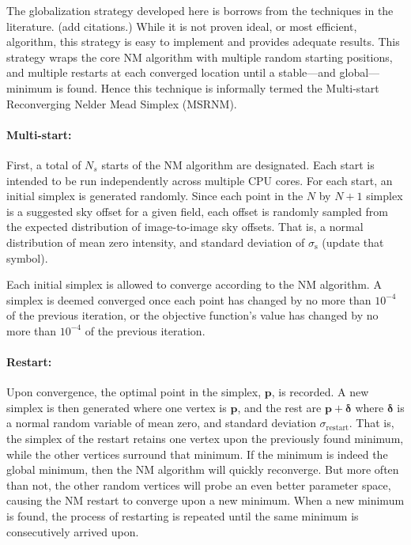 \documentclass[iop]{emulateapj}
\newcommand{\vect}[1]{\boldsymbol{#1}} %
\newcommand{\todo}[1]{\textcolor{RedOrange}{#1}} %
\begin{document}
The globalization strategy developed here is borrows from the techniques in the literature.
\todo{(add citations.)}
While it is not proven ideal, or most efficient, algorithm, this strategy is easy to implement and provides adequate results.
This strategy wraps the core NM algorithm with multiple random starting positions, and multiple restarts at each converged location until a stable---and global---minimum is found.
Hence this technique is informally termed the Multi-start Reconverging Nelder Mead Simplex (MSRNM).

\paragraph{Multi-start:} First, a total of $N_s$ starts of the NM algorithm are designated.
Each start is intended to be run independently across multiple CPU cores.
For each start, an initial simplex is generated randomly.
Since each point in the $N$ by $N+1$ simplex is a suggested sky offset for a given field, each offset is randomly sampled from the expected distribution of image-to-image sky offsets.
That is, a normal distribution of mean zero intensity, and standard deviation of $\sigma_\mathrm{s}$ (\todo{update that symbol}).

Each initial simplex is allowed to converge according to the NM algorithm.
A simplex is deemed converged once each point has changed by no more than $10^{-4}$ of the previous iteration, or the objective function's value has changed by no more than $10^{-4}$ of the previous iteration. 

\paragraph{Restart:} Upon convergence, the optimal point in the simplex, $\vect{p}$, is recorded.
A new simplex is then generated where one vertex is $\vect{p}$, and the rest are $\vect{p}+\vect{\delta}$ where $\vect{\delta}$ is a normal random variable of mean zero, and standard deviation $\sigma_\mathrm{restart}$.
That is, the simplex of the restart retains one vertex upon the previously found minimum, while the other vertices surround that minimum.
If the minimum is indeed the global minimum, then the NM algorithm will quickly reconverge.
But more often than not, the other random vertices will probe an even better parameter space, causing the NM restart to converge upon a new minimum.
When a new minimum is found, the process of restarting is repeated until the same minimum is consecutively arrived upon.
\end{document}
